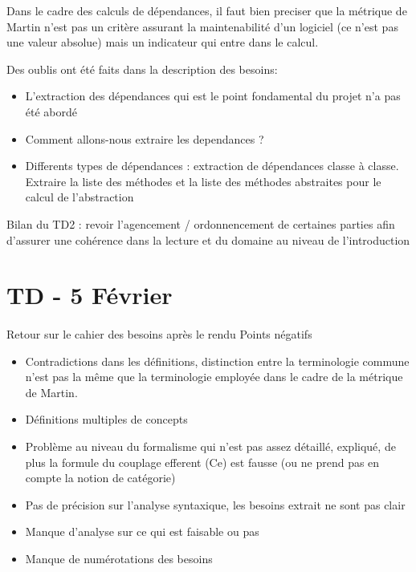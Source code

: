 \documentclass{scrartcl}
\begin{document}
Dans le cadre des calculs de dépendances, il faut bien preciser que la métrique de Martin n'est pas un critère assurant la maintenabilité d'un logiciel (ce n'est pas une valeur absolue) mais un indicateur qui entre dans le calcul.

Des oublis ont été faits dans la description des besoins:
\begin{itemize}
    \item L'extraction des dépendances qui est le point fondamental du projet n'a pas été abordé
    \item Comment allons-nous extraire les dependances ?
    \item Differents types de dépendances : extraction de dépendances classe à classe. Extraire la liste des méthodes et la liste des méthodes abstraites pour le calcul de l'abstraction
\end{itemize}

Bilan du TD2 : revoir l'agencement / ordonnencement de certaines parties afin d'assurer une cohérence dans la lecture et du domaine au niveau de l'introduction

\pagebreak

\section{TD - 5 Février}
\paragraph{}Retour sur le cahier des besoins après le rendu
\newline
Points négatifs
\begin{itemize}
    \item Contradictions dans les définitions, distinction entre la terminologie commune n'est pas la même que la terminologie employée dans le cadre de la métrique de Martin.
    \item Définitions multiples de concepts
    \item Problème au niveau du formalisme qui n'est pas assez détaillé, expliqué, de plus la formule du couplage efferent (Ce) est fausse (ou ne prend pas en compte la notion de catégorie)
    \item Pas de précision sur l'analyse syntaxique, les besoins extrait ne sont pas clair
    \item Manque d'analyse sur ce qui est faisable ou pas
    \item Manque de numérotations des besoins
\end{itemize}
\end{document}
